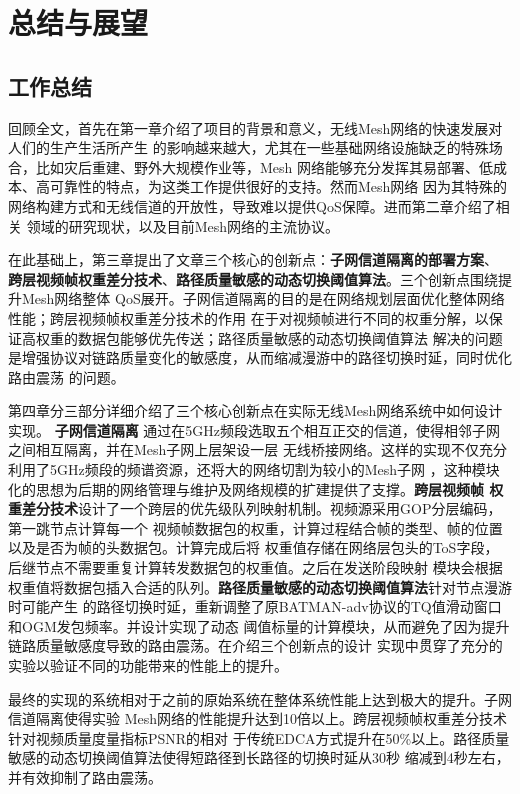 \chapter{总结与展望}
\label{cha:conclusion}

\section{工作总结}
回顾全文，首先在第一章介绍了项目的背景和意义，无线Mesh网络的快速发展对人们的生产生活所产生
的影响越来越大，尤其在一些基础网络设施缺乏的特殊场合，比如灾后重建、野外大规模作业等，Mesh
网络能够充分发挥其易部署、低成本、高可靠性的特点，为这类工作提供很好的支持。然而Mesh网络
因为其特殊的网络构建方式和无线信道的开放性，导致难以提供QoS保障。进而第二章介绍了相关
领域的研究现状，以及目前Mesh网络的主流协议。

在此基础上，第三章提出了文章三个核心的创新点：\textbf{子网信道隔离的部署方案}、
\textbf{跨层视频帧权重差分技术}、\textbf{路径质量敏感的动态切换阈值算法}。三个创新点围绕提升Mesh网络整体
QoS展开。子网信道隔离的目的是在网络规划层面优化整体网络性能；跨层视频帧权重差分技术的作用
在于对视频帧进行不同的权重分解，以保证高权重的数据包能够优先传送；路径质量敏感的动态切换阈值算法
解决的问题是增强协议对链路质量变化的敏感度，从而缩减漫游中的路径切换时延，同时优化路由震荡
的问题。

第四章分三部分详细介绍了三个核心创新点在实际无线Mesh网络系统中如何设计实现。\textbf{
子网信道隔离}
通过在5GHz频段选取五个相互正交的信道，使得相邻子网之间相互隔离，并在Mesh子网上层架设一层
无线桥接网络。这样的实现不仅充分利用了5GHz频段的频谱资源，还将大的网络切割为较小的Mesh子网
，这种模块化的思想为后期的网络管理与维护及网络规模的扩建提供了支撑。\textbf{跨层视频帧
权重差分技术}设计了一个跨层的优先级队列映射机制。视频源采用GOP分层编码，第一跳节点计算每一个
视频帧数据包的权重，计算过程结合帧的类型、帧的位置以及是否为帧的头数据包。计算完成后将
权重值存储在网络层包头的ToS字段，后继节点不需要重复计算转发数据包的权重值。之后在发送阶段映射
模块会根据权重值将数据包插入合适的队列。\textbf{路径质量敏感的动态切换阈值算法}针对节点漫游时可能产生
的路径切换时延，重新调整了原BATMAN-adv协议的TQ值滑动窗口和OGM发包频率。并设计实现了动态
阈值标量的计算模块，从而避免了因为提升链路质量敏感度导致的路由震荡。在介绍三个创新点的设计
实现中贯穿了充分的实验以验证不同的功能带来的性能上的提升。

最终的实现的系统相对于之前的原始系统在整体系统性能上达到极大的提升。子网信道隔离使得实验
Mesh网络的性能提升达到10倍以上。跨层视频帧权重差分技术针对视频质量度量指标PSNR的相对
于传统EDCA方式提升在50\%以上。路径质量敏感的动态切换阈值算法使得短路径到长路径的切换时延从30秒
缩减到4秒左右，并有效抑制了路由震荡。

